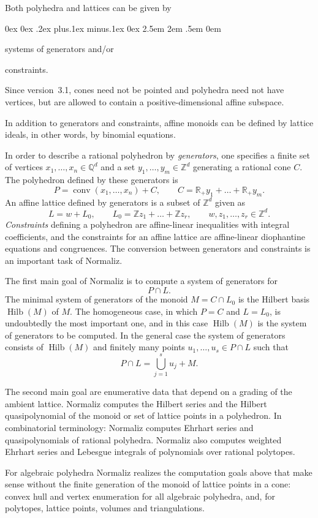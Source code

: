 \documentclass[12pt,a4paper]{scrartcl}
\newcounter{listi}
\newcommand{\stdli}{ \topsep0ex \partopsep0ex %
\parsep.2ex plus.1ex minus.1ex \itemsep0ex%
\leftmargin2.5em \labelwidth2em \labelsep.5em \rightmargin0em}%
\newenvironment{arab}{\begin{list}{\textup{(\arabic{listi})}}%
	{\usecounter{listi}\stdli}}{\end{list}}
\theoremstyle{definition}
\def\ZZ{{\mathbb Z}}
\def\QQ{{\mathbb Q}}
\def\RR{{\mathbb R}}
\DeclareMathOperator{\conv}{conv}
\DeclareMathOperator{\Hilb}{Hilb}
\begin{document}
Both polyhedra and lattices can be given by
\begin{arab}
	\item systems of generators and/or
	\item constraints.
\end{arab}
Since version~3.1, cones need not be pointed and polyhedra need not have vertices, but are allowed to contain a positive-dimensional affine subspace.

In addition to generators and constraints, affine monoids can be defined by lattice ideals, in other words, by binomial equations.

In order to describe a rational polyhedron by \emph{generators}, one specifies a finite set of vertices $x_1,\dots,x_n\in\QQ^d$ and a set $y_1,\dots,y_m\in\ZZ^d$ generating a rational cone $C$. The polyhedron defined by these generators is
$$
P=\conv(x_1,\dots,x_n)+C,\qquad C=\RR_+y_1+\dots+\RR_+y_m.
$$
An affine lattice defined by generators is a subset of $\ZZ^d$ given as
$$
L=w+L_0,\qquad L_0=\ZZ z_1+\dots+\ZZ z_r, \qquad w,z_1,\dots,z_r\in \ZZ^d.
$$
\emph{Constraints} defining a polyhedron are affine-linear inequalities with integral coefficients, and the constraints for an affine lattice are affine-linear diophantine equations and congruences. The conversion between generators and constraints is an important task of Normaliz.


The first main goal of Normaliz is to compute a system of generators for
$$
P\cap L.
$$
The minimal system of generators of the monoid $M=C\cap L_0$ is the Hilbert basis $\Hilb(M)$ of $M$. The homogeneous case, in which $P=C$ and $L=L_0$, is undoubtedly the most important one, and in this case $\Hilb(M)$ is the system of generators to be computed. In the general case the system of generators consists of $\Hilb(M)$ and finitely many points $u_1,\dots,u_s\in P\cap L$ such that
$$
P\cap L=\bigcup_{j=1}^s u_j+M.
$$

The second main goal are enumerative data that depend on a grading
of the ambient lattice. Normaliz computes the Hilbert series and
the Hilbert quasipolynomial of the monoid or set of lattice points in a polyhedron. In combinatorial terminology: Normaliz computes Ehrhart series and quasipolynomials of rational polyhedra. Normaliz also computes weighted
Ehrhart series and Lebesgue integrals of polynomials over
rational polytopes.

For algebraic polyhedra Normaliz realizes the computation goals above that make sense without the finite generation of the monoid of lattice points in a cone: convex hull and vertex enumeration for all algebraic polyhedra, and, for polytopes, lattice points, volumes and triangulations.
\end{document}
